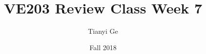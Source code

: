 \documentclass{beamer}
\newif\ifpre
\begin{document}
\title{VE203 Review Class Week 7}
\institute[FA2018 VE203]{}
\author{Tianyi Ge}
\date{Fall 2018}
\maketitle



\ifpre
\begin{frame}{The End}
  \centering \huge
  Thank You!
\end{frame}
\fi
\end{document}
